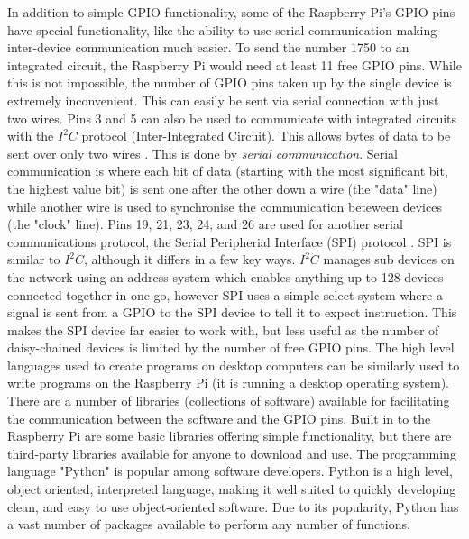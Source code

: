 \documentclass[a4]{report}
\begin{document}
	In addition to simple GPIO functionality, some of the Raspberry Pi's GPIO pins have special functionality, like the ability to use serial communication making inter-device communication much easier. To send the number 1750 to an integrated circuit, the Raspberry Pi would need at least 11 free GPIO pins. While this is not impossible, the number of GPIO pins taken up by the single device is extremely inconvenient. This can easily be sent via serial connection with just two wires. Pins 3 and 5 can also be used to communicate with integrated circuits with the \(I^2 C\) protocol (Inter-Integrated Circuit). This allows bytes of data to be sent over only two wires \cite{backwhatisi2c}. This is done by \textit{serial communication}. Serial communication is where each bit of data (starting with the most significant bit, the highest value bit) is sent one after the other down a wire (the "data" line) \cite{backwhatisserpar} while another wire is used to synchronise the communication beteween devices (the "clock" line). Pins 19, 21, 23, 24, and 26 are used for another serial communications protocol, the Serial Peripherial Interface (SPI) protocol \cite{backwhatisspi}. SPI is similar to \(I^2 C\), although it differs in a few key ways.  \(I^2 C\) manages sub devices on the network using an address system which enables anything up to 128 devices connected together in one go, however SPI uses a simple select system where a signal is sent from a GPIO to the SPI device to tell it to expect instruction. This makes the SPI device far easier to work with, but less useful as the number of daisy-chained devices is limited by the number of free GPIO pins. \newline \newline  \noindent
	The high level languages used to create programs on desktop computers can be similarly used to write programs on the Raspberry Pi (it is running a desktop operating system). There are a number of libraries (collections of software) available for facilitating the communication between the software and the GPIO pins. Built in to the Raspberry Pi are some basic libraries offering simple functionality, but there are third-party libraries available for anyone to download and use\cite{pilibswiringpi, pilibspigpio}. The programming language "Python" is popular among software developers. Python is a high level, object oriented, interpreted language, making it well suited to quickly developing clean, and easy to use object-oriented software. Due to its popularity, Python has a vast number of packages available to perform any number of functions. \newline \newline \noindent
\end{document}
